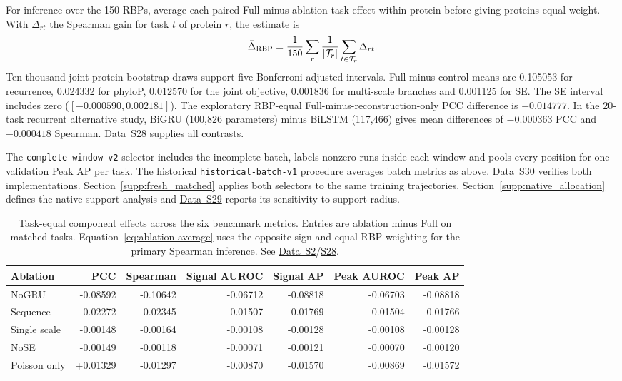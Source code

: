 \documentclass[11pt,a4paper]{article}
\newcommand{\tableid}[1]{\setcounter{table}{\numexpr#1-1\relax}}
\newcommand{\sr}[1]{\ref{#1}}
\newcommand{\data}[1]{\hyperref[data:S#1]{Data~S#1}}
\newcommand{\sdata}[1]{\hyperref[data:S#1]{S#1}}
\begin{document}
For inference over the 150 RBPs, average each paired Full-minus-ablation task effect within protein before giving proteins equal weight. With $\Delta_{rt}$ the Spearman gain for task $t$ of protein $r$, the estimate is
\begin{equation}\label{eq:ablation-average}
\bar\Delta_{\rm RBP}=\frac{1}{150}\sum_r\frac{1}{|\mathcal T_r|}\sum_{t\in\mathcal T_r}\Delta_{rt}.
\end{equation}
Ten thousand joint protein bootstrap draws support five Bonferroni-adjusted intervals. Full-minus-control means are 0.105053 for recurrence, 0.024332 for phyloP, 0.012570 for the joint objective, 0.001836 for multi-scale branches and 0.001125 for SE. The SE interval includes zero ($[-0.000590,0.002181]$). The exploratory RBP-equal Full-minus-reconstruction-only PCC difference is $-0.014777$. In the 20-task recurrent alternative study, BiGRU (100,826 parameters) minus BiLSTM (117,466) gives mean differences of $-0.000363$ PCC and $-0.000418$ Spearman. \data{28} supplies all contrasts.

The \texttt{complete-window-v2} selector includes the incomplete batch, labels nonzero runs inside each window and pools every position for one validation Peak AP per task. The historical \texttt{historical-batch-v1} procedure averages batch metrics as above. \data{30} verifies both implementations. Section~\sr{supp:fresh_matched} applies both selectors to the same training trajectories. Section~\sr{supp:native_allocation} defines the native support analysis and \data{29} reports its sensitivity to support radius.

\tableid{2}
\begin{table}[H]
\centering
\caption{Task-equal component effects across the six benchmark metrics. Entries are ablation minus Full on matched tasks. Equation~\eqref{eq:ablation-average} uses the opposite sign and equal RBP weighting for the primary Spearman inference. See \data{2}/\sdata{28}.}
\label{tab:s2-ablation}
\small\setlength{\tabcolsep}{4pt}
\begin{tabular}{@{}lrrrrrr@{}}\toprule
Ablation & PCC & Spearman & Signal AUROC & Signal AP & Peak AUROC & Peak AP \\
\midrule
NoGRU & -0.08592 & -0.10642 & -0.06712 & -0.08818 & -0.06703 & -0.08818 \\
Sequence & -0.02272 & -0.02345 & -0.01507 & -0.01769 & -0.01504 & -0.01766 \\
Single scale & -0.00148 & -0.00164 & -0.00108 & -0.00128 & -0.00108 & -0.00128 \\
NoSE & -0.00149 & -0.00118 & -0.00071 & -0.00121 & -0.00070 & -0.00120 \\
Poisson only & +0.01329 & -0.01297 & -0.00870 & -0.01570 & -0.00869 & -0.01572 \\
\bottomrule
\end{tabular}
\end{table}
\end{document}
